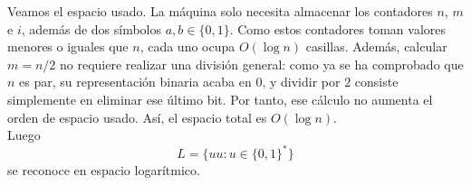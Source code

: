 \documentclass[12pt]{article}
\begin{document}
\begin{ejercicio}[1.3 puntos]
        Veamos el espacio usado. La máquina solo necesita almacenar los contadores
        $n$, $m$ e $i$, además de dos símbolos $a,b\in\{0,1\}$. Como estos contadores
        toman valores menores o iguales que $n$, cada uno ocupa $O(\log n)$ casillas.
        Además, calcular $m=n/2$ no requiere realizar una división general: como ya se
        ha comprobado que $n$ es par, su representación binaria acaba en $0$, y dividir
        por $2$ consiste simplemente en eliminar ese último bit. Por tanto, ese cálculo
        no aumenta el orden de espacio usado. Así, el espacio total es $O(\log n)$. \\

        Luego
        $$
        L=\{uu : u\in\{0,1\}^*\}
        $$
        se reconoce en espacio logarítmico.
    \end{ejercicio}

    \newpage
\end{document}
